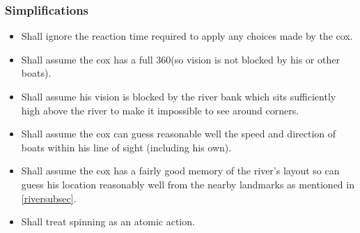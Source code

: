\subsubsection{Simplifications}
\begin{itemize}
  \item Shall ignore the reaction time required to apply any choices
    made by the cox.
  \item Shall assume the cox has a full 360\textdegree (so vision is
    not blocked by his or other boats). 
  \item Shall assume his
    vision is blocked by the river bank which sits sufficiently high
    above the river to make it impossible to see around corners.
  \item Shall assume the cox can guess reasonable well the speed and
    direction of boats within his line of sight (including his own).
  \item Shall assume the cox has a fairly good memory of the river's
    layout so can guess his location reasonably well from the nearby
    landmarks as mentioned in \ref{riversubsec}.
  \item Shall treat spinning as an atomic action.
\end{itemize}

